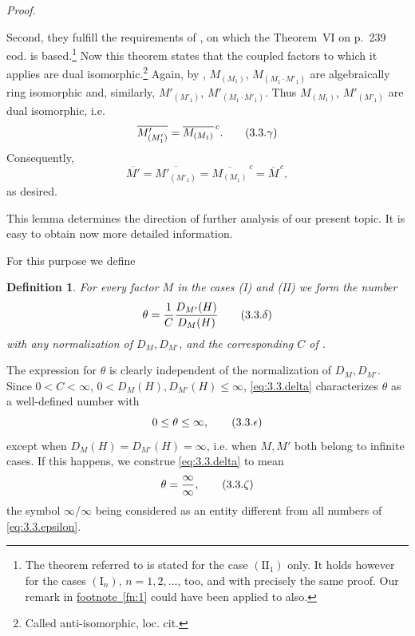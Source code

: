 \documentclass[b5paper,twoside]{article}
\theoremstyle{mvnplain}
\newtheorem{definition}{Definition}[section]
\renewenvironment{proof}[1][Proof]{%
  \par\addvspace{0.35\baselineskip}%
  \noindent\textit{#1.}\ \normalfont\ignorespaces
}{%
  \par\addvspace{0.35\baselineskip}%
}
\newcommand{\M}{\mathbf M}
\newcommand{\Hilbert}{\mathfrak H}
\def\M{M}%
\def\Hilbert{H}%
\def\mathfrak#1{#1}%
\begin{document}
\begin{proof}
Second, they fulfill the requirements of \cite[p.~235, beginning of
\S4.1]{ref6}, on which the Theorem~VI on p.~239 eod. is based.\footnote{\hypertarget{fn:21}{}The
theorem referred to is stated for the case \((\mathrm {II}_1)\) only. It holds
however for the cases \((\mathrm I_n)\), \(n=1,2,\ldots\), too, and with
precisely the same proof. Our remark in
\hyperref[fn:1]{footnote~\ref*{fn:1}} could have been applied to
\cite{ref6} also.} Now this theorem states that the coupled factors to which it
applies are dual isomorphic.\footnote{\hypertarget{fn:22}{}Called anti-isomorphic, loc. cit.} Again,
by \cite[p.~188, Lemma~11.4.1]{ref5},
\(\M_{(\mathfrak M_1)}\),
\(\M_{(\mathfrak M_1\cdot\mathfrak M'_1)}\) are algebraically ring
isomorphic and, similarly,
\(\M'_{(\mathfrak M'_1)}\),
\(\M'_{(\mathfrak M_1\cdot\mathfrak M'_1)}\). Thus
\(\M_{(\mathfrak M_1)}\), \(\M'_{(\mathfrak M'_1)}\) are dual isomorphic,
i.e.
\begin{equation}
  \overline{\M'_{(\mathfrak M'_1)}}
  =\overline{\M_{(\mathfrak M_1)}}^{\,c}.
  \tag{3.3.\ensuremath{\gamma}}\label{eq:3.3.gamma}
\end{equation}
Consequently,
\[
  \overline{\M'}
  =\overline{\M'_{(\mathfrak M'_1)}}
  =\overline{\M_{(\mathfrak M_1)}}^{\,c}
  =\overline{\M}^{\,c},
\]
as desired.
\end{proof}

This lemma determines the direction of further analysis of our present topic.
It is easy to obtain now more detailed information.

For this purpose we define

\begin{definition}\label{def:3.3.1}
For every factor \(\M\) in the cases (I) and (II) we form the number
\begin{equation}
  \theta=\frac{1}{C}\frac{D_{\M'}(\Hilbert)}{D_{\M}(\Hilbert)}
  \tag{3.3.\ensuremath{\delta}}\label{eq:3.3.delta}
\end{equation}
with any normalization of \(D_{\M},D_{\M'}\), and the corresponding \(C\)
of \cite[p.~182, Theorem~X]{ref5}.
\end{definition}

The expression for \(\theta\) is clearly independent of the normalization of
\(D_{\M},D_{\M'}\). Since
\(0<C<\infty\), \(0<D_{\M}(\Hilbert),D_{\M'}(\Hilbert)\leq\infty\),
\eqref{eq:3.3.delta} characterizes \(\theta\) as a well-defined number with
\begin{equation}
  0\leq\theta\leq\infty,
  \tag{3.3.\ensuremath{\epsilon}}\label{eq:3.3.epsilon}
\end{equation}
except when \(D_{\M}(\Hilbert)=D_{\M'}(\Hilbert)=\infty\), i.e. when
\(\M,\M'\) both belong to infinite cases. If this happens, we construe
\eqref{eq:3.3.delta} to mean
\begin{equation}
  \theta=\frac{\infty}{\infty},
  \tag{3.3.\ensuremath{\zeta}}\label{eq:3.3.zeta}
\end{equation}
the symbol \(\infty/\infty\) being considered as an entity different from all
numbers of \eqref{eq:3.3.epsilon}.
\end{document}
